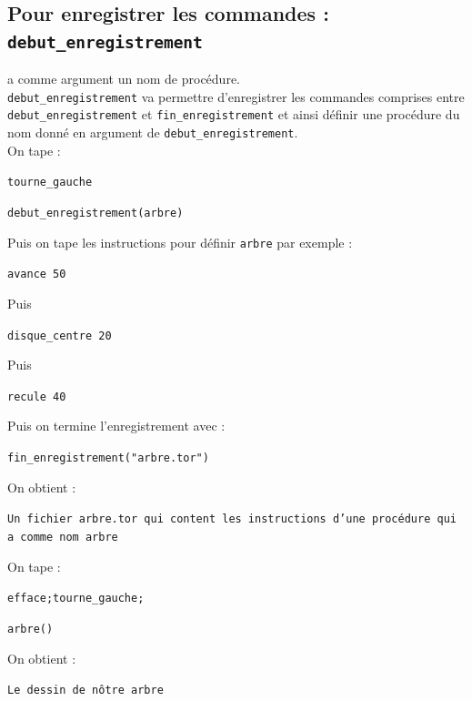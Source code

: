 \documentclass[a4paper,11pt]{book}
\begin{document}
\subsection{Pour enregistrer les commandes : {\tt debut\_enregistrement}}
 a comme argument un nom de proc\'edure.\\
{\tt debut\_enregistrement} va permettre d'enregistrer les commandes comprises 
entre {\tt debut\_enregistrement} et {\tt fin\_enregistrement} et ainsi
d\'efinir une proc\'edure du nom donn\'e en argument de 
{\tt debut\_enregistrement}.\\
On tape :
\begin{center}{\tt tourne\_gauche }\end{center}
\begin{center}{\tt debut\_enregistrement(arbre)}\end{center}
Puis on tape les instructions pour d\'efinir {\tt arbre} par exemple :
\begin{center}{\tt avance 50}\end{center}
Puis
\begin{center}{\tt disque\_centre 20}\end{center}
Puis
\begin{center}{\tt recule 40}\end{center}
Puis on termine  l'enregistrement avec :
\begin{center}{\tt fin\_enregistrement("arbre.tor")}\end{center}
On obtient :
\begin{center}{\tt Un fichier arbre.tor qui content les instructions d'une 
proc\'edure qui a comme nom arbre}\end{center}
On tape :
\begin{center}{\tt efface;tourne\_gauche;}\end{center}
\begin{center}{\tt arbre()}\end{center}
On obtient :
\begin{center}{\tt Le dessin de n\^otre arbre}\end{center}
\end{document}

